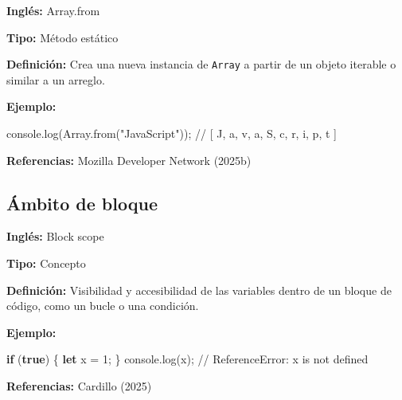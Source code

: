 \documentclass[
  letterpaper,
  DIV=11,
  numbers=noendperiod]{scrreprt}
\newenvironment{Shaded}{\begin{snugshade}}{\end{snugshade}}
\newcommand{\BuiltInTok}[1]{\textcolor[rgb]{0.00,0.23,0.31}{#1}}
\newcommand{\CommentTok}[1]{\textcolor[rgb]{0.37,0.37,0.37}{#1}}
\newcommand{\ControlFlowTok}[1]{\textcolor[rgb]{0.00,0.23,0.31}{\textbf{#1}}}
\newcommand{\DecValTok}[1]{\textcolor[rgb]{0.68,0.00,0.00}{#1}}
\newcommand{\FunctionTok}[1]{\textcolor[rgb]{0.28,0.35,0.67}{#1}}
\newcommand{\KeywordTok}[1]{\textcolor[rgb]{0.00,0.23,0.31}{\textbf{#1}}}
\newcommand{\NormalTok}[1]{\textcolor[rgb]{0.00,0.23,0.31}{#1}}
\newcommand{\OperatorTok}[1]{\textcolor[rgb]{0.37,0.37,0.37}{#1}}
\newcommand{\StringTok}[1]{\textcolor[rgb]{0.13,0.47,0.30}{#1}}
\let\oldsubsection\subsection
\renewcommand{\subsection}{\phantomsection\oldsubsection}
\begin{document}
\textbf{Inglés:} Array.from

\textbf{Tipo:} Método estático

\textbf{Definición:} Crea una nueva instancia de \texttt{Array} a partir
de un objeto iterable o similar a un arreglo.

\textbf{Ejemplo:}

\begin{Shaded}
\begin{Highlighting}[]
\BuiltInTok{console}\OperatorTok{.}\FunctionTok{log}\NormalTok{(}\BuiltInTok{Array}\OperatorTok{.}\FunctionTok{from}\NormalTok{(}\StringTok{"JavaScript"}\NormalTok{))}\OperatorTok{;}
\CommentTok{// [ \textquotesingle{}J\textquotesingle{}, \textquotesingle{}a\textquotesingle{}, \textquotesingle{}v\textquotesingle{}, \textquotesingle{}a\textquotesingle{}, \textquotesingle{}S\textquotesingle{}, \textquotesingle{}c\textquotesingle{}, \textquotesingle{}r\textquotesingle{}, \textquotesingle{}i\textquotesingle{}, \textquotesingle{}p\textquotesingle{}, \textquotesingle{}t\textquotesingle{} ]}
\end{Highlighting}
\end{Shaded}

\textbf{Referencias:} Mozilla Developer Network (2025b)

\subsection*{Ámbito de bloque}\label{glos-ambito_de_bloque}

\textbf{Inglés:} Block scope

\textbf{Tipo:} Concepto

\textbf{Definición:} Visibilidad y accesibilidad de las variables dentro
de un bloque de código, como un bucle o una condición.

\textbf{Ejemplo:}

\begin{Shaded}
\begin{Highlighting}[]
\ControlFlowTok{if}\NormalTok{ (}\KeywordTok{true}\NormalTok{) \{}
    \KeywordTok{let}\NormalTok{ x }\OperatorTok{=} \DecValTok{1}\OperatorTok{;}
\NormalTok{\}}
\BuiltInTok{console}\OperatorTok{.}\FunctionTok{log}\NormalTok{(x)}\OperatorTok{;} \CommentTok{// ReferenceError: x is not defined}
\end{Highlighting}
\end{Shaded}

\textbf{Referencias:} Cardillo (2025)
\end{document}

